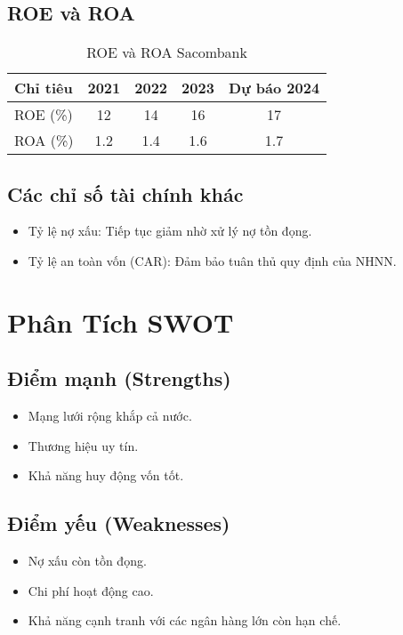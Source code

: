 \documentclass[11pt]{article}
\begin{document}
\subsection{ROE và ROA}

\begin{table}[h!]
\centering
\caption{ROE và ROA Sacombank}
\begin{tabular}{lcccc}
\toprule
Chỉ tiêu & 2021 & 2022 & 2023 & Dự báo 2024 \\
\midrule
ROE (\%) & 12 & 14 & 16 & 17 \\
ROA (\%) & 1.2 & 1.4 & 1.6 & 1.7 \\
\bottomrule
\end{tabular}
\end{table}

\subsection{Các chỉ số tài chính khác}
\begin{itemize}
    \item Tỷ lệ nợ xấu: Tiếp tục giảm nhờ xử lý nợ tồn đọng.
    \item Tỷ lệ an toàn vốn (CAR): Đảm bảo tuân thủ quy định của NHNN.
\end{itemize}

\section{Phân Tích SWOT}

\subsection{Điểm mạnh (Strengths)}
\begin{itemize}
    \item Mạng lưới rộng khắp cả nước.
    \item Thương hiệu uy tín.
    \item Khả năng huy động vốn tốt.
\end{itemize}

\subsection{Điểm yếu (Weaknesses)}
\begin{itemize}
    \item Nợ xấu còn tồn đọng.
    \item Chi phí hoạt động cao.
    \item Khả năng cạnh tranh với các ngân hàng lớn còn hạn chế.
\end{itemize}
\end{document}
